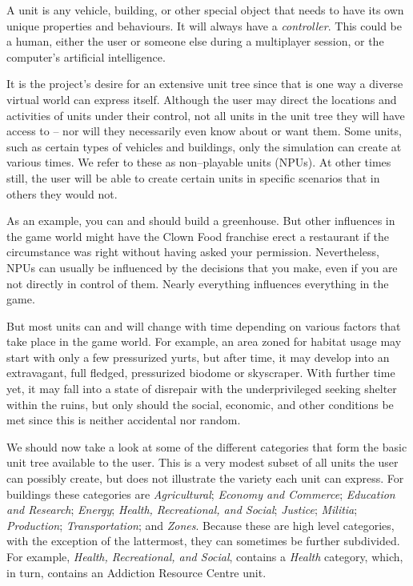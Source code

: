 

A unit is any vehicle, building, or other special object that needs to have its own unique properties and behaviours. It will always have a {\it controller}. This could be a human, either the user or someone else during a multiplayer session, or the computer's artificial intelligence.

It is the project's desire for an extensive unit tree since that is one way a diverse virtual world can express itself. Although the user may direct the locations and activities of units under their control, not all units in the unit tree they will have access to -- nor will they necessarily even know about or want them. Some units, such as certain types of vehicles and buildings, only the simulation can create at various times. We refer to these as non--playable units (NPUs). At other times still, the user will be able to create certain units in specific scenarios that in others they would not.

As an example, you can and should build a greenhouse. But other influences in the game world might have the Clown Food franchise erect a restaurant if the circumstance was right without having asked your permission. Nevertheless, NPUs can usually be influenced by the decisions that you make, even if you are not directly in control of them. Nearly everything influences everything in the game.

But most units can and will change with time depending on various factors that take place in the game world. For example, an area zoned for habitat usage may start with only a few pressurized yurts, but after time, it may develop into an extravagant, full fledged, pressurized biodome or skyscraper. With further time yet, it may fall into a state of disrepair with the underprivileged seeking shelter within the ruins, but only should the social, economic, and other conditions be met since this is neither accidental nor random.

We should now take a look at some of the different categories that form the basic unit tree available to the user. This is a very modest subset of all units the user can possibly create, but does not illustrate the variety each unit can express. For buildings these categories are {\it Agricultural}; {\it Economy and Commerce}; {\it Education and Research}; {\it Energy}; {\it Health, Recreational, and Social}; {\it Justice}; {\it Militia}; {\it Production}; {\it Transportation}; and {\it Zones}. Because these are high level categories, with the exception of the lattermost, they can sometimes be further subdivided. For example, {\it Health, Recreational, and Social}, contains a {\it Health} category, which, in turn, contains an Addiction Resource Centre unit.

